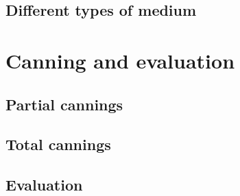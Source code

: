 \documentclass{article}
\begin{document}
\subsection{Different types of medium}

\section{Canning and evaluation}

\subsection{Partial cannings}

\subsection{Total cannings}

\subsection{Evaluation}

\printbibliography[heading=bibintoc]
\end{document}
